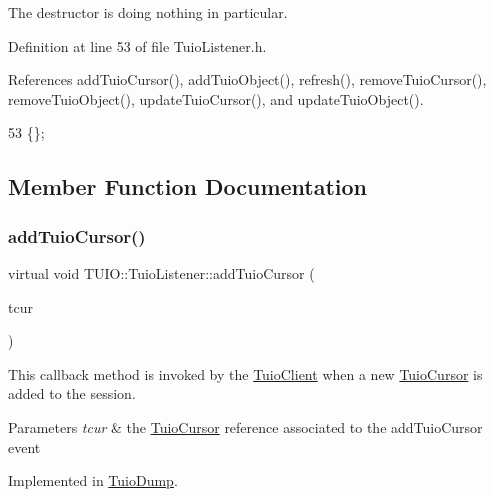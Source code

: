 The destructor is doing nothing in particular. 

Definition at line 53 of file Tuio\+Listener.\+h.



References add\+Tuio\+Cursor(), add\+Tuio\+Object(), refresh(), remove\+Tuio\+Cursor(), remove\+Tuio\+Object(), update\+Tuio\+Cursor(), and update\+Tuio\+Object().


\begin{DoxyCode}
53 \{\};
\end{DoxyCode}


\subsection{Member Function Documentation}
\mbox{\label{class_t_u_i_o_1_1_tuio_listener_a431a957994470c3767e94379debeb875}} 
\subsubsection{\texorpdfstring{add\+Tuio\+Cursor()}{addTuioCursor()}}
{\footnotesize\ttfamily virtual void T\+U\+I\+O\+::\+Tuio\+Listener\+::add\+Tuio\+Cursor (\begin{DoxyParamCaption}\item[{\hyperlink{class_t_u_i_o_1_1_tuio_cursor}{Tuio\+Cursor} $\ast$}]{tcur }\end{DoxyParamCaption})\hspace{0.3cm}{\ttfamily [pure virtual]}}

This callback method is invoked by the \hyperlink{class_t_u_i_o_1_1_tuio_client}{Tuio\+Client} when a new \hyperlink{class_t_u_i_o_1_1_tuio_cursor}{Tuio\+Cursor} is added to the session.


\begin{DoxyParams}{Parameters}
{\em tcur} & the \hyperlink{class_t_u_i_o_1_1_tuio_cursor}{Tuio\+Cursor} reference associated to the add\+Tuio\+Cursor event \\
\hline
\end{DoxyParams}


Implemented in \hyperlink{class_tuio_dump_ab633ec2cbd9472a8c128fac33fca183f}{Tuio\+Dump}.



